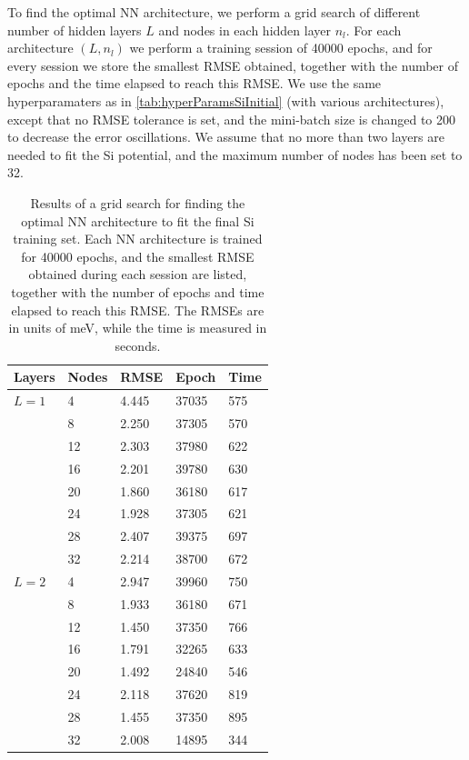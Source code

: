 \documentclass[twoside,english]{uiofysmaster}
\begin{document}
To find the optimal NN architecture, we perform a grid search of different 
number of hidden layers $L$ and nodes in each hidden layer $n_l$. 
For each architecture $(L,n_l)$ we perform a training session of 40000 epochs, and for every session we store 
the smallest RMSE obtained, together with the number of epochs and the time elapsed to reach this RMSE. 
We use the same hyperparamaters as in \autoref{tab:hyperParamsSiInitial} (with various architectures), 
except that no RMSE tolerance is set, and the mini-batch size is changed to 200 to decrease the error oscillations. 
We assume that no more than two layers are needed to fit the Si potential, and the maximum number of nodes has been 
set to 32.
\begin{table} 
  \begin{center}
    \begin{tabular*}{10cm}{l @{\extracolsep{\fill}} llll}
      \toprule
      Layers & Nodes & RMSE & Epoch & Time \\ 
      \hline
      $L=1$ & 4  & 4.445 & 37035 & 575 \\
            & 8  & 2.250 & 37305 & 570 \\
            & 12 & 2.303 & 37980 & 622 \\
            & 16 & 2.201 & 39780 & 630 \\
            & 20 & 1.860 & 36180 & 617 \\ 
            & 24 & 1.928 & 37305 & 621 \\
            & 28 & 2.407 & 39375 & 697 \\
            & 32 & 2.214 & 38700 & 672 \\
      $L=2$ & 4  & 2.947 & 39960 & 750 \\
            & 8  & 1.933 & 36180 & 671 \\
            & 12 & 1.450 & 37350 & 766 \\
            & 16 & 1.791 & 32265 & 633 \\
            & 20 & 1.492 & 24840 & 546 \\
            & 24 & 2.118 & 37620 & 819 \\
            & 28 & 1.455 & 37350 & 895 \\
            & 32 & 2.008 & 14895 & 344 \\
      \bottomrule
      \end{tabular*} 
    \end{center}
    \captionsetup{width=12cm}
      \caption{Results of a grid search for finding the optimal NN architecture to fit the final Si training set. 
               Each NN architecture is trained for 40000 epochs, and the smallest RMSE obtained during each session
               are listed, together with the number of epochs and time elapsed to reach this RMSE. 
               The RMSEs are in units of meV, while the time is measured in seconds.} 
  \label{tab:gridSearch} 
\end{table}
\end{document}
